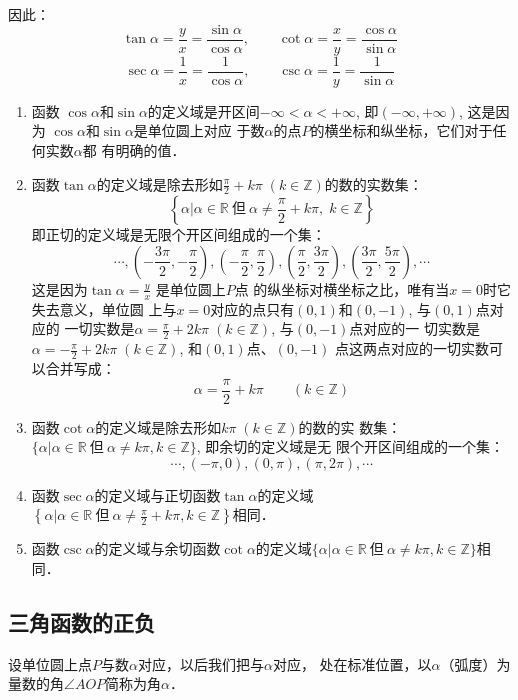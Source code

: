 因此：
\[\tan\alpha=\frac{y}{x}=\frac{\sin\alpha}{\cos\alpha},\qquad \cot\alpha=\frac{x}{y}=\frac{\cos\alpha}{\sin\alpha}\]
\[ \sec\alpha=\frac{1}{x}=\frac{1}{\cos\alpha},\qquad \csc\alpha=\frac{1}{y}=\frac{1}{\sin\alpha}\]

\begin{enumerate}
    \item 函数 $\cos\alpha$和$\sin\alpha$的定义域是开区间$-\infty<\alpha<+\infty$,
    即$(-\infty,+\infty)$, 这是因为 $\cos\alpha$和$\sin\alpha$是单位圆上对应
    于数$\alpha$的点$P$的横坐标和纵坐标，它们对于任何实数$\alpha$都
    有明确的值．
\item 函数$\tan\alpha$的定义域是除去形如$\frac{\pi}{2}+k\pi\; (k\in\mathbb{Z})$的数的实数集：
    \[\left\{\alpha\Big|\alpha\in\mathbb{R}\ \text{但}\ \alpha\ne \frac{\pi}{2}+k\pi, \; k\in\mathbb{Z} \right\} \]
    即正切的定义域是无限个开区间组成的一个集：
\[\cdots, \left(-\frac{3\pi}{2},-\frac{\pi}{2}\right), \left(-\frac{\pi}{2},\frac{\pi}{2}\right), \left(\frac{\pi}{2},\frac{3\pi}{2}\right),\left(\frac{3\pi}{2},\frac{5\pi}{2}\right),\cdots\]
这是因为$\tan\alpha =\frac{y}{x}$
是单位圆上$P$点
的纵坐标对横坐标之比，唯有当$x=0$时它失去意义，单位圆
上与$x=0$对应的点只有$(0,1)$和$(0,-1)$, 与$(0,1)$点对应的
一切实数是$\alpha=\frac{\pi}{2}+2k\pi\; (k\in\mathbb{Z})$, 与$(0,-1)$点对应的一
切实数是$\alpha=-\frac{\pi}{2}+2k\pi\; (k\in\mathbb{Z})$, 和$(0,1)$点、$(0,-1)$
点这两点对应的一切实数可以合并写成：
\[\alpha=\frac{\pi}{2}+k\pi\qquad  (k\in\mathbb{Z})\]
\item 函数$\cot\alpha$的定义域是除去形如$k\pi\;  (k\in\mathbb{Z})$的数的实
数集：$\{\alpha|\alpha\in\mathbb{R}\ \text{但}\ \alpha\ne k\pi ,k\in\mathbb{Z}\}$, 即余切的定义域是无
限个开区间组成的一个集：
\[\cdots, (-\pi ,0),(0,\pi ),(\pi ,2\pi ),\cdots\]
\item 函数$\sec\alpha$的定义域与正切函数$\tan\alpha$的定义域$\left\{\alpha\Big|\alpha\in\mathbb{R}\ \text{但}\ \alpha\ne \frac{\pi}{2}+k\pi ,k\in\mathbb{Z}\right\}$相同．
\item 函数$\csc\alpha$的定义域与余切函数$\cot\alpha$的定义域$\{\alpha|\alpha\in\mathbb{R}\ \text{但}\ \alpha\ne k\pi ,k\in\mathbb{Z}\}$相同．
\end{enumerate}

\subsection{三角函数的正负}
设单位圆上点$P$与数$\alpha$对应，以后我们把与$\alpha$对应，
处在标准位置，以$\alpha$（弧度）为量数的角$\angle AOP$简称为角$\alpha$．

